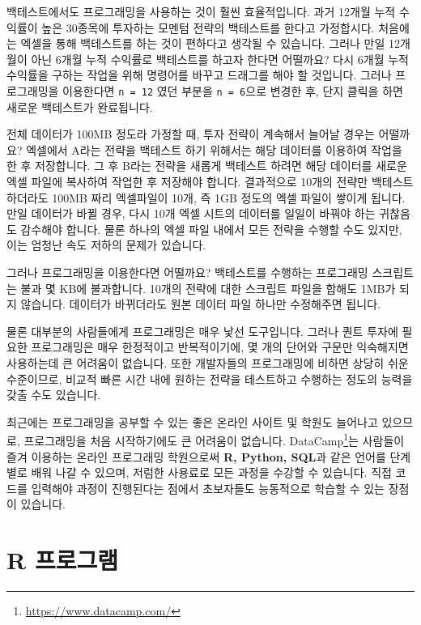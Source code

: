 \documentclass[]{book}
\let\rmarkdownfootnote\footnote%
\def\footnote{\protect\rmarkdownfootnote}
\begin{document}
백테스트에서도 프로그래밍을 사용하는 것이 훨씬 효율적입니다. 과거 12개월 누적 수익률이 높은 30종목에 투자하는 모멘텀 전략의 백테스트를 한다고 가정합시다. 처음에는 엑셀을 통해 백테스트를 하는 것이 편하다고 생각될 수 있습니다. 그러나 만일 12개월이 아닌 6개월 누적 수익률로 백테스트를 하고자 한다면 어떨까요? 다시 6개월 누적 수익률을 구하는 작업을 위해 명령어를 바꾸고 드래그를 해야 할 것입니다. 그러나 프로그래밍을 이용한다면 \texttt{n\ =\ 12} 였던 부분을 \texttt{n\ =\ 6}으로 변경한 후, 단지 클릭을 하면 새로운 백테스트가 완료됩니다.

전체 데이터가 100MB 정도라 가정할 때, 투자 전략이 계속해서 늘어날 경우는 어떨까요? 엑셀에서 A라는 전략을 백테스트 하기 위해서는 해당 데이터를 이용하여 작업을 한 후 저장합니다. 그 후 B라는 전략을 새롭게 백테스트 하려면 해당 데이터를 새로운 엑셀 파일에 복사하여 작업한 후 저장해야 합니다. 결과적으로 10개의 전략만 백테스트 하더라도 100MB 짜리 엑셀파일이 10개, 즉 1GB 정도의 엑셀 파일이 쌓이게 됩니다. 만일 데이터가 바뀔 경우, 다시 10개 엑셀 시트의 데이터를 일일이 바꿔야 하는 귀찮음도 감수해야 합니다. 물론 하나의 엑셀 파일 내에서 모든 전략을 수행할 수도 있지만, 이는 엄청난 속도 저하의 문제가 있습니다.

그러나 프로그래밍을 이용한다면 어떨까요? 백테스트를 수행하는 프로그래밍 스크립트는 불과 몇 KB에 불과합니다. 10개의 전략에 대한 스크립트 파일을 합해도 1MB가 되지 않습니다. 데이터가 바뀌더라도 원본 데이터 파일 하나만 수정해주면 됩니다.

물론 대부분의 사람들에게 프로그래밍은 매우 낯선 도구입니다. 그러나 퀀트 투자에 필요한 프로그래밍은 매우 한정적이고 반복적이기에, 몇 개의 단어와 구문만 익숙해지면 사용하는데 큰 어려움이 없습니다. 또한 개발자들의 프로그래밍에 비하면 상당히 쉬운 수준이므로, 비교적 빠른 시간 내에 원하는 전략을 테스트하고 수행하는 정도의 능력을 갖출 수도 있습니다.

최근에는 프로그래밍을 공부할 수 있는 좋은 온라인 사이트 및 학원도 늘어나고 있으므로, 프로그래밍을 처음 시작하기에도 큰 어려움이 없습니다. DataCamp\footnote{\url{https://www.datacamp.com/}}는 사람들이 즐겨 이용하는 온라인 프로그래밍 학원으로써 \textbf{R, Python, SQL}과 같은 언어를 단계별로 배워 나갈 수 있으며, 저럼한 사용료로 모든 과정을 수강할 수 있습니다. 직접 코드를 입력해야 과정이 진행된다는 점에서 초보자들도 능동적으로 학습할 수 있는 장점이 있습니다.

\hypertarget{r-}{%
\section{R 프로그램}\label{r-}}
\end{document}
